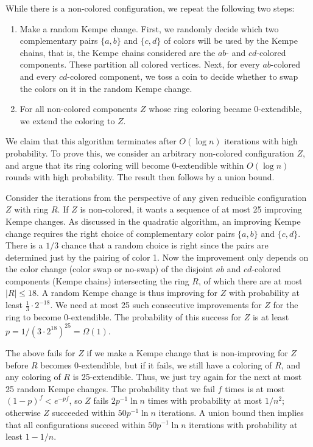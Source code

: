 \documentclass[10pt,a4paper]{article}
\begin{document}
While there is a non-colored configuration, we repeat the following two
steps:
\begin{enumerate}
    \item Make
    a random Kempe change.
    First, we randomly
    decide which two complementary pairs $\{a,b\}$ and $\{c,d\}$ of colors will be used by the Kempe chains, that is, the Kempe chains 
    considered are the $ab$- and $cd$-colored 
    components. These partition all colored vertices. Next, for every $ab$-colored and every $cd$-colored component, we toss a coin to decide whether to swap the colors on it in the random Kempe change.
    \item For all non-colored components $Z$ whose ring coloring became $0$-extendible, we extend the coloring to $Z$.
\end{enumerate}
We claim that this 
algorithm terminates after $O(\log n)$ iterations with high probability. To prove 
this, we consider an arbitrary non-colored configuration $Z$, and argue that its ring coloring will become $0$-extendible within $O(\log n)$ rounds with high probability. The result then follows by a union bound.


Consider the iterations from
the perspective of any given reducible configuration $Z$ with ring $R$. If $Z$ is non-colored, it wants a sequence of at most 25 improving Kempe changes. As discussed in the quadratic algorithm, an improving Kempe change requires the right choice of complementary color pairs $\{a,b\}$ and $\{c,d\}$.
There is a $1/3$ chance that a random choice is right since the pairs are determined just by the pairing of color 1. Now the improvement only depends on the color change (color swap or no-swap) 
of the disjoint $ab$ and $cd$-colored components (Kempe chains) intersecting the ring $R$, of which there are at most
$|R|\leq 18$. A random Kempe change is thus improving for $Z$ with probability at least $\tfrac{1}{3}\cdot 2^{-18}$. We need at most 25 such consecutive improvements for $Z$ for the ring to become $0$-extendible. The probability of this success for $Z$ is at least $p=1/(3\cdot 2^{18})^{25}=\Omega(1)$.

The above fails for $Z$ if we make a Kempe change that is non-improving for $Z$ before $R$ becomes $0$-extendible, but if it fails, we still have a coloring of $R$, and any coloring of $R$ is 25-extendible. Thus, we just try again for the next at most 25 random Kempe changes. The probability that we fail $f$ times is at most
$(1-p)^f<e^{-pf}$, so $Z$ fails $2p^{-1}\ln n$ times with probability
at most $1/n^2$; otherwise
$Z$ succeeded within 
$50p^{-1}\ln n$ iterations. A union bound then implies that 
all configurations succeed
within $50p^{-1}\ln n$ iterations with probability at least $1-1/n$.
\end{document}
